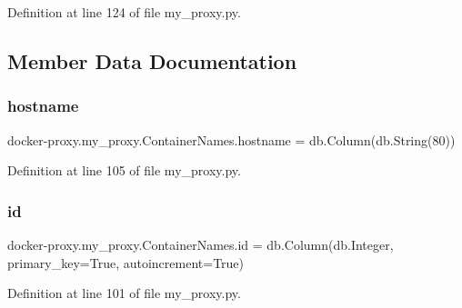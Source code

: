 Definition at line 124 of file my\+\_\+proxy.\+py.



\subsection{Member Data Documentation}
\hypertarget{classdocker-proxy_1_1my__proxy_1_1_container_names_aacca73fd2984a6225ff6f82fb681a508}{}\label{classdocker-proxy_1_1my__proxy_1_1_container_names_aacca73fd2984a6225ff6f82fb681a508} 
\subsubsection{\texorpdfstring{hostname}{hostname}}
{\footnotesize\ttfamily docker-\/proxy.\+my\+\_\+proxy.\+Container\+Names.\+hostname = db.\+Column(db.\+String(80))\hspace{0.3cm}{\ttfamily [static]}}



Definition at line 105 of file my\+\_\+proxy.\+py.

\hypertarget{classdocker-proxy_1_1my__proxy_1_1_container_names_a7013f7adde5d40aedd4169afb3be1978}{}\label{classdocker-proxy_1_1my__proxy_1_1_container_names_a7013f7adde5d40aedd4169afb3be1978} 
\subsubsection{\texorpdfstring{id}{id}}
{\footnotesize\ttfamily docker-\/proxy.\+my\+\_\+proxy.\+Container\+Names.\+id = db.\+Column(db.\+Integer, primary\+\_\+key=True, autoincrement=True)\hspace{0.3cm}{\ttfamily [static]}}



Definition at line 101 of file my\+\_\+proxy.\+py.

\hypertarget{classdocker-proxy_1_1my__proxy_1_1_container_names_a5223d4e116bb162d327af3fbdf406c62}{}\label{classdocker-proxy_1_1my__proxy_1_1_container_names_a5223d4e116bb162d327af3fbdf406c62} 
